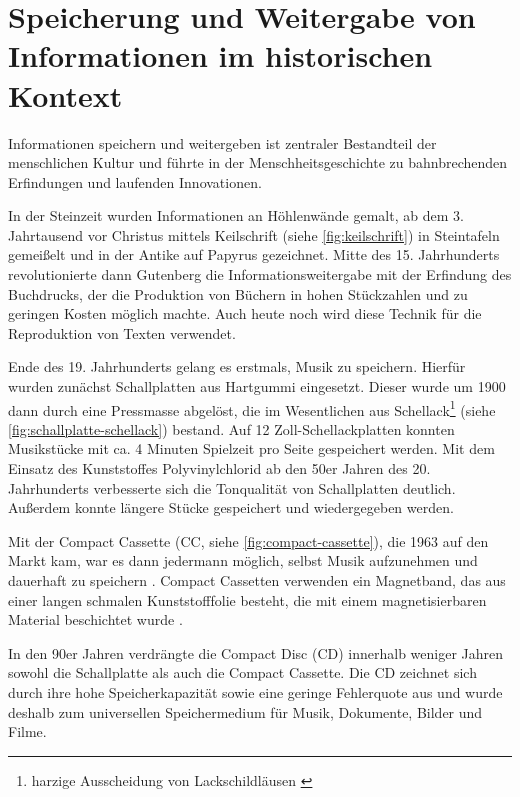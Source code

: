 \section{Speicherung und Weitergabe von Informationen im historischen Kontext}

Informationen speichern und weitergeben ist zentraler Bestandteil der
menschlichen Kultur und führte in der Menschheitsgeschichte zu bahnbrechenden
Erfindungen und laufenden Innovationen.

In der Steinzeit wurden Informationen an Höhlenwände gemalt, ab dem 3.
Jahrtausend vor Christus mittels Keilschrift (siehe \autoref{fig:keilschrift})
in Steintafeln gemeißelt und in der Antike auf Papyrus gezeichnet. Mitte des 15.
Jahrhunderts revolutionierte dann Gutenberg die Informationsweitergabe mit der
Erfindung des Buchdrucks, der die Produktion von Büchern in hohen Stückzahlen
und zu geringen Kosten möglich machte. Auch heute noch wird diese Technik für
die Reproduktion von Texten verwendet.

Ende des 19. Jahrhunderts gelang es erstmals, Musik zu speichern. Hierfür wurden
zunächst Schallplatten aus Hartgummi eingesetzt. Dieser wurde um 1900 dann durch
eine Pressmasse abgelöst, die im Wesentlichen aus Schellack\footnote{harzige
Ausscheidung von Lackschildläusen \cite{schellack}} (siehe
\autoref{fig:schallplatte-schellack}) bestand. Auf 12 Zoll-Schellackplatten
konnten Musikstücke mit ca. 4 Minuten Spielzeit pro Seite gespeichert werden.
Mit dem Einsatz des Kunststoffes Polyvinylchlorid ab den 50er Jahren des 20.
Jahrhunderts verbesserte sich die Tonqualität von Schallplatten deutlich.
Außerdem konnte längere Stücke gespeichert und wiedergegeben werden.
\cite{schallplatte1}

Mit der Compact Cassette (CC, siehe \autoref{fig:compact-cassette}), die 1963
auf den Markt kam, war es dann jedermann möglich, selbst Musik aufzunehmen und
dauerhaft zu speichern \cite{kassette1}. Compact Cassetten verwenden ein
Magnetband, das aus einer langen schmalen Kunststofffolie besteht, die mit einem
magnetisierbaren Material beschichtet wurde \cite{kassette2}.

In den 90er Jahren verdrängte  die Compact Disc (CD) innerhalb weniger Jahren
sowohl die Schallplatte als auch die Compact Cassette. Die CD zeichnet sich
durch ihre hohe Speicherkapazität sowie eine geringe Fehlerquote aus und wurde
deshalb zum universellen Speichermedium für Musik, Dokumente, Bilder und Filme.
\cite{cd_durchbruch}


